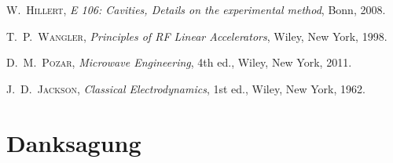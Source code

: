 \documentclass[11pt, a4paper]{scrbook}
\begin{document}
	\backmatter
		
	\begin{thebibliography}{19}
		\textsc{W.\ Hillert},
		\emph{E 106: Cavities, Details on the experimental method}, Bonn, 2008.

		\textsc{T.\ P.\ Wangler},
		\emph{Principles of RF Linear Accelerators},
		Wiley, New York, 1998.
	
		\textsc{D.\ M.\ Pozar},
		\emph{Microwave Engineering}, 4th ed.,
		Wiley, New York, 2011.
	
		\textsc{J.\ D.\ Jackson},
		\emph{Classical Electrodynamics}, 1st ed.,
		Wiley, New York, 1962.
	
	\end{thebibliography}
	
	\chapter{Danksagung}
	
	\listoffigures
	\listoftables
	
\end{document}
